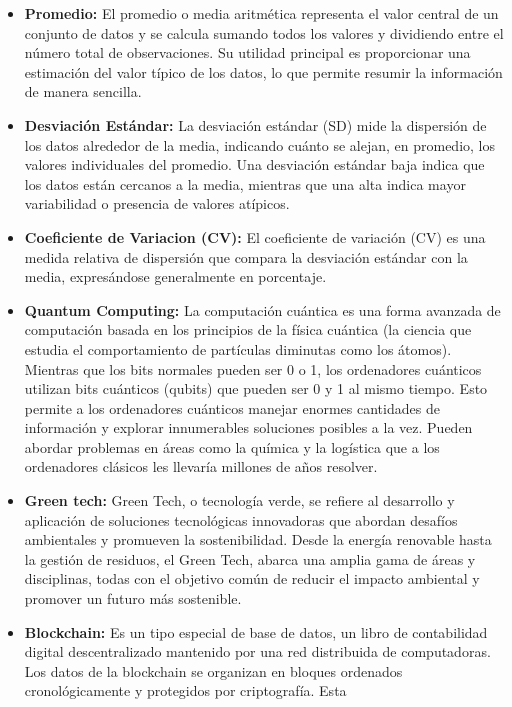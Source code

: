\documentclass[oneside,11pt]{Latex/Classes/PhDthesisPSnPDF}
\begin{document}
\begin{itemize}
\item
  \textbf{Promedio:} El promedio o media aritmética representa el valor
  central de un conjunto de datos y se calcula sumando todos los valores
  y dividiendo entre el número total de observaciones. Su utilidad
  principal es proporcionar una estimación del valor típico de los
  datos, lo que permite resumir la información de manera sencilla.
\item
  \textbf{Desviación Estándar:} La desviación estándar (SD) mide la
  dispersión de los datos alrededor de la media, indicando cuánto se
  alejan, en promedio, los valores individuales del promedio. Una
  desviación estándar baja indica que los datos están cercanos a la
  media, mientras que una alta indica mayor variabilidad o presencia de
  valores atípicos.
\item
  \textbf{Coeficiente de Variacion (CV):} El coeficiente de variación
  (CV) es una medida relativa de dispersión que compara la desviación
  estándar con la media, expresándose generalmente en porcentaje.
\item
  \textbf{Quantum Computing:} La computación cuántica es una forma
  avanzada de computación basada en los principios de la física cuántica
  (la ciencia que estudia el comportamiento de partículas diminutas como
  los átomos). Mientras que los bits normales pueden ser 0 o 1, los
  ordenadores cuánticos utilizan bits cuánticos (qubits) que pueden ser
  0 y 1 al mismo tiempo. Esto permite a los ordenadores cuánticos
  manejar enormes cantidades de información y explorar innumerables
  soluciones posibles a la vez. Pueden abordar problemas en áreas como
  la química y la logística que a los ordenadores clásicos les llevaría
  millones de años resolver.
\item
  \textbf{Green tech:} Green Tech, o tecnología verde, se refiere al
  desarrollo y aplicación de soluciones tecnológicas innovadoras que
  abordan desafíos ambientales y promueven la sostenibilidad. Desde la
  energía renovable hasta la gestión de residuos, el Green Tech, abarca
  una amplia gama de áreas y disciplinas, todas con el objetivo común de
  reducir el impacto ambiental y promover un futuro más sostenible.
\item
  \textbf{Blockchain:} Es un tipo especial de base de datos, un libro de
  contabilidad digital descentralizado mantenido por una red distribuida
  de computadoras. Los datos de la blockchain se organizan en bloques
  ordenados cronológicamente y protegidos por criptografía. Esta

\end{itemize}
\end{document}
